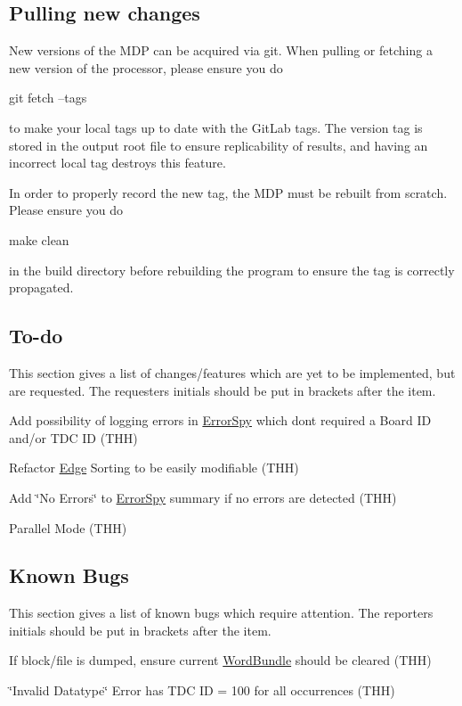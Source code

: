 \subsection*{Pulling new changes}

New versions of the M\+DP can be acquired via git. When pulling or fetching a new version of the processor, please ensure you do 
\begin{DoxyCode}
git fetch --tags
\end{DoxyCode}
 to make your local tags up to date with the Git\+Lab tags. The version tag is stored in the output root file to ensure replicability of results, and having an incorrect local tag destroys this feature.

In order to properly record the new tag, the M\+DP must be rebuilt from scratch. Please ensure you do 
\begin{DoxyCode}
make clean
\end{DoxyCode}
 in the build directory before rebuilding the program to ensure the tag is correctly propagated.

\subsection*{To-\/do}

This section gives a list of changes/features which are yet to be implemented, but are requested. The requester\textquotesingle{}s initials should be put in brackets after the item.


\begin{DoxyItemize}
\item Add possibility of logging errors in \hyperlink{class_error_spy}{Error\+Spy} which don\textquotesingle{}t required a Board ID and/or T\+DC ID (T\+HH)
\item Refactor \hyperlink{class_edge}{Edge} Sorting to be easily modifiable (T\+HH)
\item Add \char`\"{}\+No Errors\char`\"{} to \hyperlink{class_error_spy}{Error\+Spy} summary if no errors are detected (T\+HH)
\item Parallel Mode (T\+HH)
\end{DoxyItemize}

\subsection*{Known Bugs}

This section gives a list of known bugs which require attention. The reporter\textquotesingle{}s initials should be put in brackets after the item.


\begin{DoxyItemize}
\item If block/file is dumped, ensure current \hyperlink{class_word_bundle}{Word\+Bundle} should be cleared (T\+HH)
\item \char`\"{}\+Invalid Datatype\char`\"{} Error has T\+DC ID = 100 for all occurrences (T\+HH) 
\end{DoxyItemize}
